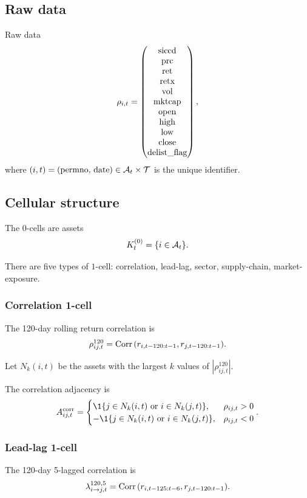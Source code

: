\documentclass[11pt]{article}
\begin{document}
\subsection{Raw data}
Raw data \[\rho_{i,t} = \begin{pmatrix}
    \text{siccd}\\
    \text{prc}\\
    \text{ret}\\
    \text{retx}\\
    \text{vol}\\
    \text{mktcap}\\
    \text{open}\\
    \text{high}\\
    \text{low}\\
    \text{close}\\
    \text{delist\_flag}
\end{pmatrix},\] where \((i,t) = (\text{permno, date}) \in \mathcal A_t \times \mathcal T\) is the unique identifier.

\subsection{Cellular structure}
The $0$-cells are assets \[K^\pa{0}_t = \st{i\in \mathcal A_t}.\]

There are five types of $1$-cell:  correlation,
      lead-lag,
     sector,
     supply-chain,
    market-exposure.

\subsubsection{Correlation 1-cell}
The 120-day rolling return correlation is
\[
    \rho_{ij,t}^{120}
    =
    \operatorname{Corr}{\left\lparen r_{i,t-120:t-1}, r_{j,t-120:t-1}\right\rparen}.
\]

Let $N_k(i,t)$ be the assets with the largest $k$ values of $|\rho_{ij,t}^{120}|$. 

The correlation adjacency is
\[
    A_{ij,t}^{\mathrm{corr}}
    =
    \begin{cases}
        \1\{j \in N_k(i,t) \text{ or } i \in N_k(j,t)\},& \rho_{ij,t}>0\\
        -\1\{j \in N_k(i,t) \text{ or } i \in N_k(j,t)\},& \rho_{ij,t}<0
    \end{cases}.
\]

\subsubsection{Lead-lag 1-cell}
The 120-day 5-lagged correlation is
\[
    \lambda_{i\to j,t}^{120,5}
    =
    \operatorname{Corr}{\left\lparen r_{i,t-125:t-6}, r_{j,t-120:t-1}\right\rparen}.
\]
\end{document}
